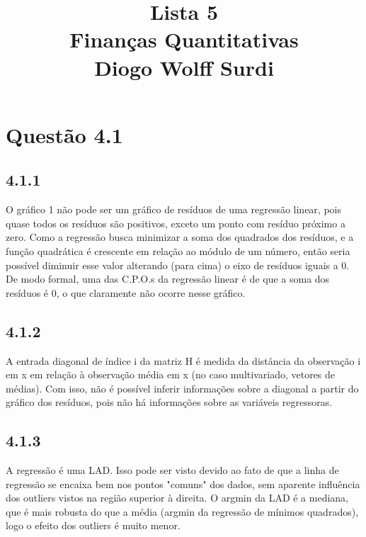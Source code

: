 \documentclass[12pt]{article}
\title{Lista 5\\
Finanças Quantitativas\\
Diogo Wolff Surdi}
\begin{document}
	
\maketitle

\section*{Questão 4.1}

\subsection*{4.1.1}
O gráfico 1 não pode ser um gráfico de resíduos de uma regressão linear, pois quase todos os resíduos são positivos, exceto um ponto com resíduo próximo a zero. Como a regressão busca minimizar a soma dos quadrados dos resíduos, e a função quadrática é crescente em relação ao módulo de um número, então seria possível diminuir esse valor alterando (para cima) o eixo de resíduos iguais a 0. De modo formal, uma das C.P.O.s da regressão linear é de que a soma dos resíduos é 0, o que claramente não ocorre nesse gráfico.

\subsection*{4.1.2}
A entrada diagonal de índice i da matriz H é medida da distância da observação i em x em relação à observação média em x (no caso multivariado, vetores de médias). Com isso, não é possível inferir informações sobre a diagonal a partir do gráfico dos resíduos, pois não há informações sobre as variáveis regressoras.

\subsection*{4.1.3}
A regressão é uma LAD. Isso pode ser visto devido ao fato de que a linha de regressão se encaixa bem nos pontos "comuns" dos dados, sem aparente influência dos outliers vistos na região superior à direita. O argmin da LAD é a mediana, que é mais robusta do que a média (argmin da regressão de mínimos quadrados), logo o efeito dos outliers é muito menor.
\end{document}
